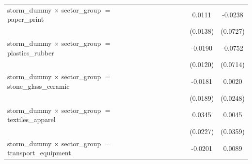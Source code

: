 \begin{tabular}{lcccccccc}
   storm\_dummy $\times$ sector\_group $=$ paper\_print                           &                       &                       &                       &                       &                       &                       & 0.0111                & -0.0238\\   
                                                                                  &                       &                       &                       &                       &                       &                       & (0.0138)              & (0.0727)\\   
   storm\_dummy $\times$ sector\_group $=$ plastics\_rubber                       &                       &                       &                       &                       &                       &                       & -0.0190               & -0.0752\\   
                                                                                  &                       &                       &                       &                       &                       &                       & (0.0120)              & (0.0714)\\   
   storm\_dummy $\times$ sector\_group $=$ stone\_glass\_ceramic                  &                       &                       &                       &                       &                       &                       & -0.0181               & 0.0020\\   
                                                                                  &                       &                       &                       &                       &                       &                       & (0.0189)              & (0.0248)\\   
   storm\_dummy $\times$ sector\_group $=$ textiles\_apparel                      &                       &                       &                       &                       &                       &                       & 0.0345                & 0.0045\\   
                                                                                  &                       &                       &                       &                       &                       &                       & (0.0227)              & (0.0359)\\   
   storm\_dummy $\times$ sector\_group $=$ transport\_equipment                   &                       &                       &                       &                       &                       &                       & -0.0201               & 0.0089\\   

\end{tabular}
